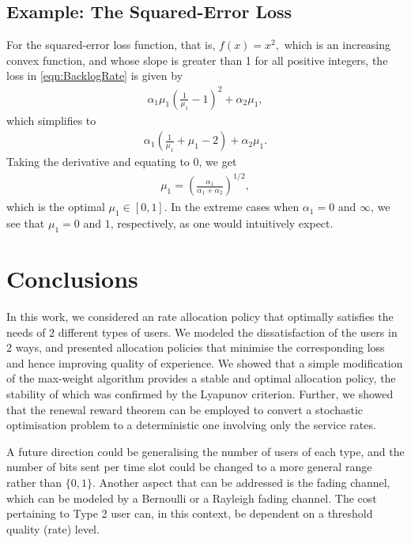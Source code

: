 \documentclass[10pt,a4paper]{article}
\begin{document}
\subsection{Example: The Squared-Error Loss}

For the squared-error loss function, that is, $f(x) = x^2,$ which is an increasing convex function, and whose slope is greater than 1 for all positive integers, the loss in \eqref{eqn:BacklogRate} is given by 
\begin{align*}
\alpha_1 \mu_1\left(\frac{1}{\mu_1}-1\right)^2 + \alpha_2 \mu_1,
\end{align*}
which simplifies to 
\begin{align*}
\alpha_1 \left(\frac{1}{\mu_1}+\mu_1 -2\right) +\alpha_2 \mu_1.
\end{align*}
Taking the derivative and equating to $0$, we get 
\begin{align*}
\mu_1 = \left(\frac{\alpha_1}{\alpha_1 + \alpha_2}\right)^{1/2},
\end{align*} 
which is the optimal $\mu_1 \in [0,1].$ In the extreme cases when $\alpha_1 = 0$ and $\infty$, we see that $\mu_1 = 0$ and $1$, respectively, as one would intuitively expect.

\section{Conclusions}
In this work, we considered an rate allocation policy that optimally satisfies the needs of 2 different types of users. We modeled the dissatisfaction of the users in 2 ways, and presented allocation policies that minimise the corresponding loss and hence improving quality of experience. We showed that a simple modification of the max-weight algorithm provides a stable and optimal allocation policy, the stability of which was confirmed by the Lyapunov criterion. Further, we showed that the renewal reward theorem can be employed to convert a stochastic optimisation problem to a deterministic one involving only the service rates. 

A future direction could be generalising the number of users of each type, and the number of bits sent per time slot could be changed to a more general range rather than $\{0,1\}$. Another aspect that can be addressed is the fading channel, which can be modeled by a Bernoulli or a Rayleigh fading channel. The cost pertaining to Type 2 user can, in this context, be dependent on a threshold quality (rate) level.




\end{document}
